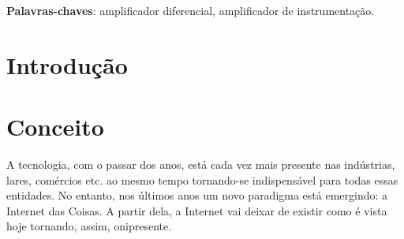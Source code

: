 \documentclass[
	article,			%
	11pt,				%
	oneside,			%
	a4paper,			%
	section=TITLE,		%
	subsection=TITLE,	%
	english,			%
	brazil,				%
	sumario=tradicional
	]{abntex2}
\begin{document}
\frenchspacing 


%
%
\maketitle

\begin{resumoumacoluna}
 \lipsum[1]
 
 \vspace{\onelineskip}
 
 \noindent
 \textbf{Palavras-chaves}: amplificador diferencial, amplificador de instrumentação.
\end{resumoumacoluna}


\textual

\section*{Introdução}








\section{Conceito}




A tecnologia, com o passar dos anos, está cada vez mais presente nas indústrias, lares, comércios 
etc. ao mesmo tempo tornando-se indispensável para todas essas entidades. No entanto, nos últimos 
anos um novo paradigma está emergindo: a Internet das Coisas. A partir dela, a Internet vai deixar 
de existir como é vista hoje tornando, assim, onipresente.
\end{document}
